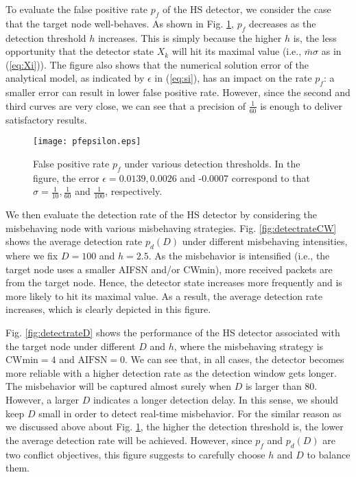 \documentclass[conference]{IEEEtran}
\begin{document}
To evaluate the false positive rate $p_f$ of the HS detector, we consider the case that the target node well-behaves. As shown in Fig. \ref{fig:pf}, $p_f$ decreases as the detection threshold $h$ increases. This is simply because the higher $h$ is, the less opportunity that the detector state $X_k$ will hit its maximal value (i.e., $\bar{m}\sigma$ as in (\ref{eq:Xi})). The figure also shows that the numerical solution error of the analytical model, as indicated by $\epsilon$ in (\ref{eq:si}), has an impact on the rate $p_f$: a smaller error can result in lower false positive rate. However, since the second and third curves are very close, we can see that a precision of $\frac{1}{60}$ is enough to deliver satisfactory results.

\begin{figure}[htbp]
\centering
  \texttt{[image: pfepsilon.eps]}
\vspace{-3mm}
  \caption{False positive rate $p_f$ under various detection thresholds. In the figure, the error $\epsilon=0.0139,0.0026$ and -0.0007 correspond to that $\sigma=\frac{1}{10},\frac{1}{60}$ and $\frac{1}{100}$, respectively.}\label{fig:pf}
\vspace{-4mm}
\end{figure}

We then evaluate the detection rate of the HS detector by considering the misbehaving node with various misbehaving strategies. Fig. \ref{fig:detectrateCW} shows the average detection rate $p_d(D)$ under different misbehaving intensities, where we fix $D=100$ and $h=2.5$. As the misbehavior is intensified (i.e., the target node uses a smaller AIFSN and/or CWmin), more received packets are from the target node. Hence, the detector state increases more frequently and is more likely to hit its maximal value. As a result, the average detection rate increases, which is clearly depicted in this figure.

Fig. \ref{fig:detectrateD} shows the performance of the HS detector associated with the target node under different $D$ and $h$, where the misbehaving strategy is $\textrm{CWmin}=4$ and $\textrm{AIFSN}=0$. We can see that, in all cases, the detector becomes more reliable with a higher detection rate as the detection window gets longer. The misbehavior will be captured almost surely when $D$ is larger than 80. However, a larger $D$ indicates a longer detection delay. In this sense, we should keep $D$ small in order to detect real-time misbehavior. For the similar reason as we discussed above about Fig. \ref{fig:pf}, the higher the detection threshold is, the lower the average detection rate will be achieved. However, since $p_f$ and $p_d(D)$ are two conflict objectives, this figure suggests to carefully choose $h$ and $D$ to balance them.
\end{document}

